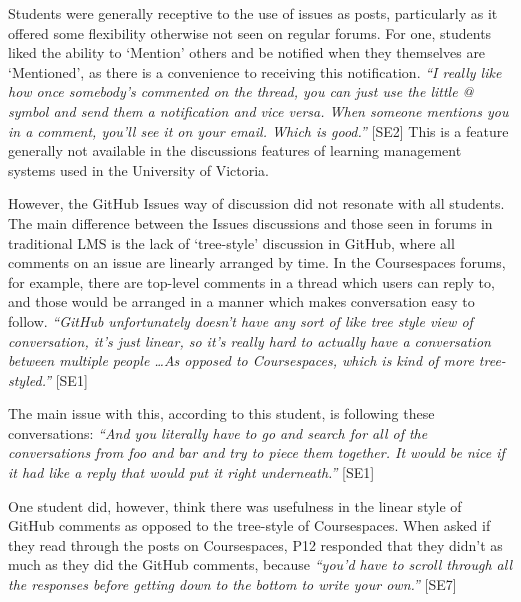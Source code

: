Students were generally receptive to the use of issues as posts, particularly as it offered some flexibility otherwise not seen on regular forums. For one, students liked the ability to `Mention' others and be notified when they themselves are `Mentioned', as there is a convenience to receiving this notification. \textit{``I really like how once somebody's commented on the thread, you can just use the little @ symbol and send them a notification and vice versa. When someone mentions you in a comment, you'll see it on your email. Which is good.''} [SE2] This is a feature generally not available in the discussions features of learning management systems used in the University of Victoria.

However, the GitHub Issues way of discussion did not resonate with all students. The main difference between the Issues discussions and those seen in forums in traditional LMS is the lack of `tree-style' discussion in GitHub, where all comments on an issue are linearly arranged by time. In the Coursespaces forums, for example, there are top-level comments in a thread which users can reply to, and those would be arranged in a manner which makes conversation easy to follow. \textit{``GitHub unfortunately doesn't have any sort of like tree style view of conversation, it's just linear, so it's really hard to actually have a conversation between multiple people \ldots As opposed to Coursespaces, which is kind of more tree-styled.''} [SE1]

The main issue with this, according to this student, is following these conversations: \textit{``And you literally have to go and search for all of the conversations from foo and bar and try to piece them together. It would be nice if it had like a reply that would put it right underneath.''} [SE1]


One student did, however, think there was usefulness in the linear style of GitHub comments as opposed to the tree-style of Coursespaces. When asked if they read through the posts on Coursespaces, P12 responded that they didn't as much as they did the GitHub comments, because \textit{``you'd have to scroll through all the responses before getting down to the bottom to write your own.''} [SE7] %


